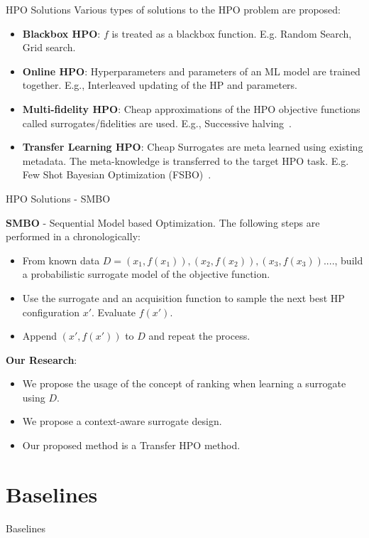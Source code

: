 \documentclass{beamer}
\begin{document}
\begin{frame}[t]{HPO Solutions}
Various types of solutions to the HPO problem are proposed:
\begin{itemize}
\item \textbf{Blackbox HPO}: $f$ is treated as a blackbox function. E.g. Random Search, Grid search.
\item \textbf{Online HPO}: Hyperparameters and parameters of an ML model are trained together. E.g., Interleaved updating of the HP and parameters. 
\item \textbf{Multi-fidelity HPO}: Cheap approximations of the HPO objective functions called surrogates/fidelities are used.
E.g., Successive halving~\cite{successivehalving}.
\item \textbf{Transfer Learning HPO}: Cheap Surrogates are meta learned using existing metadata.
The meta-knowledge is transferred to the target HPO task. 
E.g.  Few Shot Bayesian Optimization (FSBO)~\cite{fsbopaper}.
\end{itemize}
\end{frame}

\begin{frame}[t]{HPO Solutions - SMBO}

\textbf{SMBO} - Sequential Model based Optimization. The following steps are performed in a chronologically:

\begin{itemize}
\item From known data $D = {(x_1, f(x_1)), (x_2, f(x_2)), (x_3, f(x_3)) .... }$, build a probabilistic surrogate model of the objective function.
\item Use the surrogate and an acquisition function to sample the next best HP configuration $x'$. Evaluate $f(x')$.
\item Append $(x', f(x'))$ to $D$ and repeat the process.
\end{itemize}

\textbf{Our Research}:

\begin{itemize}
\item We propose the usage of the concept of ranking when learning a surrogate using $D$.
\item We propose a context-aware surrogate design.
\item Our proposed method is a Transfer HPO method.
\end{itemize}
\end{frame}


\section{Baselines}
\begin{frame}

\centering
\LARGE{Baselines}

\end{frame}
\end{document}
